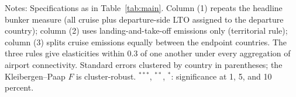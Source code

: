\documentclass[12pt]{extarticle}
\begin{document}
\begin{table}[H]
{\begin{threeparttable}
\begin{tabular}{lccc}
\bottomrule
\end{tabular}
\begin{tablenotes}[flushleft]
\footnotesize
\item Notes: Specifications as in Table~\ref{tab:main}. Column (1) repeats the headline bunker measure (all cruise plus departure-side LTO assigned to the departure country); column (2) uses landing-and-take-off emissions only (territorial rule); column (3) splits cruise emissions equally between the endpoint countries. The three rules give elasticities within 0.3 of one another under every aggregation of airport connectivity. Standard errors clustered by country in parentheses; the Kleibergen--Paap $F$ is cluster-robust. $^{***}$, $^{**}$, $^{*}$: significance at 1, 5, and 10 percent.
\end{tablenotes}
\end{threeparttable}}
\end{table}
\end{document}

